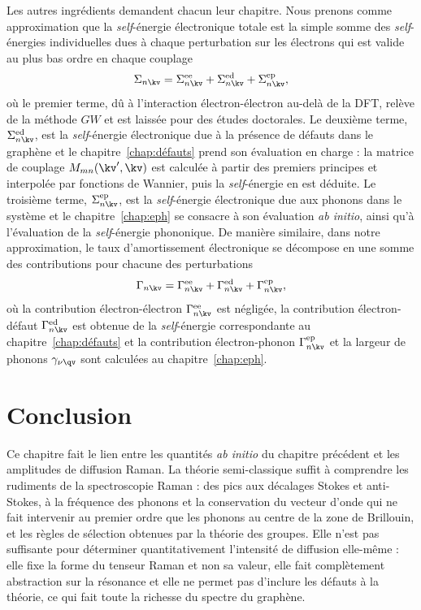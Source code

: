 Les autres ingrédients demandent chacun leur chapitre. Nous prenons comme approximation que la \textit{self}-énergie électronique totale est la simple somme des \textit{self}-énergies individuelles dues à chaque perturbation sur les électrons qui est valide au plus bas ordre en chaque couplage
\begin{equation}
    \Sigma_{n\kv} = \Sigma_{n\kv}^\text{ee}+\Sigma_{n\kv}^\text{ed}+\Sigma_{n\kv}^\text{ep},
\end{equation}
où le premier terme, dû à l'interaction électron-électron au-delà de la DFT, relève de la méthode $GW$ et est laissée pour des études doctorales. Le deuxième terme, $\Sigma_{n\kv}^\text{ed}$, est la \textit{self}-énergie électronique due à la présence de défauts dans le graphène et le chapitre~\ref{chap:défauts} prend son évaluation en charge : la matrice de couplage $M_{mn}(\kv',\kv)$ est calculée à partir des premiers principes et interpolée par fonctions de Wannier, puis la \textit{self}-énergie en est déduite. Le troisième terme, $\Sigma_{n\kv}^\text{ep}$, est la \textit{self}-énergie électronique due aux phonons dans le système et le chapitre~\ref{chap:eph} se consacre à son évaluation \textit{ab initio}, ainsi qu'à l'évaluation de la \textit{self}-énergie phononique. De manière similaire, dans notre approximation, le taux d'amortissement électronique se décompose en une somme des contributions pour chacune des perturbations
\begin{equation}
    \Gamma_{n\kv} =  \Gamma_{n\kv}^\text{ee}+ \Gamma_{n\kv}^\text{ed}+ \Gamma_{n\kv}^\text{ep},
\end{equation}
où la contribution électron-électron $\Gamma_{n\kv}^\text{ee}$ est négligée, la contribution électron-défaut $\Gamma_{n\kv}^\text{ed}$ est obtenue de la \textit{self}-énergie correspondante au chapitre~\ref{chap:défauts} et la contribution électron-phonon $ \Gamma_{n\kv}^\text{ep}$ et la largeur de phonons $\gamma_{\nu\qv}$ sont calculées au chapitre~\ref{chap:eph}.

\section{Conclusion}

Ce chapitre fait le lien entre les quantités \textit{ab initio} du chapitre précédent et les amplitudes de diffusion Raman. La théorie semi-classique suffit à comprendre les rudiments de la spectroscopie Raman : des pics aux décalages Stokes et anti-Stokes, à la fréquence des phonons et la conservation du vecteur d'onde qui ne fait intervenir au premier ordre que les phonons au centre de la zone de Brillouin, et les règles de sélection obtenues par la théorie des groupes. Elle n'est pas suffisante pour déterminer quantitativement l'intensité de diffusion elle-même : elle fixe la forme du tenseur Raman et non sa valeur, elle fait complètement abstraction sur la résonance et elle ne permet pas d'inclure les défauts à la théorie, ce qui fait toute la richesse du spectre du graphène.

